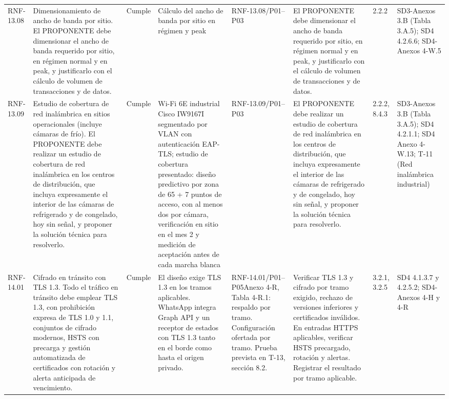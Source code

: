 \documentclass[oficio,firma,final]{lafrox}
\begin{document}
\begin{landscape}
{\begin{longtable}{@{}F{0.054} F{0.173} F{0.061} F{0.191} F{0.106} F{0.180} F{0.067} F{0.168}@{}}
  RNF-13.08 & Dimensionamiento de ancho de banda por sitio. El PROPONENTE debe dimensionar el ancho de banda requerido por sitio, en régimen normal y en peak, y justificarlo con el cálculo de volumen de transacciones y de datos. & Cumple & Cálculo del ancho de banda por sitio en régimen y peak & RNF-13.08/\allowbreak{}P01--\allowbreak{}P03 & El PROPONENTE debe dimensionar el ancho de banda requerido por sitio, en régimen normal y en peak, y justificarlo con el cálculo de volumen de transacciones y de datos. & 2.2.2 & SD3-Anexos 3.B (Tabla 3.A.5); SD4 4.2.6.6; SD4-Anexos 4-W.5  \\
  RNF-13.09 & Estudio de cobertura de red inalámbrica en sitios operacionales (incluye cámaras de frío). El PROPONENTE debe realizar un estudio de cobertura de red inalámbrica en los centros de distribución, que incluya expresamente el interior de las cámaras de refrigerado y de congelado, hoy sin señal, y proponer la solución técnica para resolverlo. & Cumple & Wi-Fi 6E industrial Cisco IW9167I segmentado por VLAN con autenticación EAP-TLS; estudio de cobertura presentado: diseño predictivo por zona de 65 + 7 puntos de acceso, con al menos dos por cámara, verificación en sitio en el mes 2 y medición de aceptación antes de cada marcha blanca & RNF-13.09/\allowbreak{}P01--\allowbreak{}P03 & El PROPONENTE debe realizar un estudio de cobertura de red inalámbrica en los centros de distribución, que incluya expresamente el interior de las cámaras de refrigerado y de congelado, hoy sin señal, y proponer la solución técnica para resolverlo. & 2.2.2, 8.4.3 & SD3-Anexos 3.B (Tabla 3.A.5); SD4 4.2.1.1; SD4 Anexo 4-W.13; T-11 (Red inalámbrica industrial)  \\
  RNF-14.01 & Cifrado en tránsito con TLS 1.3. Todo el tráfico en tránsito debe emplear TLS 1.3, con prohibición expresa de TLS 1.0 y 1.1, conjuntos de cifrado modernos, HSTS con precarga y gestión automatizada de certificados con rotación y alerta anticipada de vencimiento. & Cumple & El diseño exige TLS 1.3 en los tramos aplicables. WhatsApp integra Graph API y un receptor de estados con TLS 1.3 tanto en el borde como hasta el origen privado. & RNF-14.01/\allowbreak{}P01--\allowbreak{}P05\newline Anexo 4-R, Tabla 4-R.1: respaldo por tramo. Configuración ofertada por tramo. Prueba prevista en T-13, sección 8.2. & Verificar TLS 1.3 y cifrado por tramo exigido, rechazo de versiones inferiores y certificados inválidos. En entradas HTTPS aplicables, verificar HSTS precargado, rotación y alertas. Registrar el resultado por tramo aplicable. & 3.2.1, 3.2.5 & SD4 4.1.3.7 y 4.2.5.2; SD4-Anexos 4-H y 4-R  \\

\end{longtable}}
\end{landscape}
\end{document}
